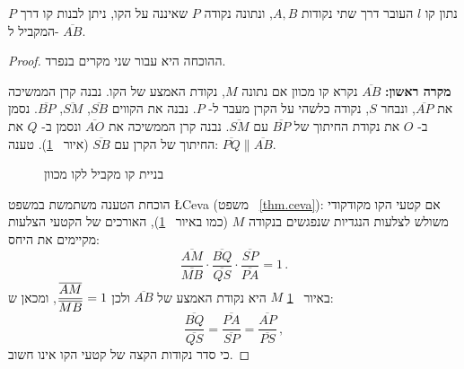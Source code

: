 \begin{theorem}\label{thm.parallel-line}
נתון קו
$l$
העובר דרך שתי נקודות
$A,B$,
ונתונה נקודה 
$P$
שאיננה על הקו, ניתן לבנות קו דרך
$P$
המקביל ל-%
$\overline{AB}$.
\end{theorem}
\begin{proof}
ההוכחה היא עבור שני מקרים בנפרד.

\textbf{מקרה ראשון:}
$\overline{AB}$
נקרא קו מכוון אם נתונה
$M$,
נקודת האמצע של הקו. נבנה קרן הממשיכה את
$\overline{AP}$,
ונבחר
$S$,
נקודה כלשהי על הקרן מעבר ל-%
$P$.
נבנה את הקווים
$\overline{SB}$, $\overline{SM}$, $\overline{BP}$.
נסמן ב-%
$O$
את נקודת החיתוך של 
$\overline{BP}$
עם
$\overline{SM}$.
נבנה קרן הממשיכה את
$\overline{AO}$
ונסמן ב-%
$Q$
את החיתוך של הקרן עם
$\overline{SB}$
(איור%
~\ref{f.se-parallel-directed}).
טענה:
$\overline{PQ}\|\overline{AB}$.

\begin{figure}[tb]
\begin{center}
\caption{בניית קו מקביל לקו מכוון}\label{f.se-parallel-directed}
\end{center}
\end{figure}
הוכחת הטענה משתמשת במשפט 
\L{Ceva}
(משפט%
~\ref{thm.ceva}): 
אם קטעי הקו מקודקודי משולש לצלעות הנגדיות שנפגשים בנקודה
$M$
(כמו באיור%
~\ref{f.se-parallel-directed}),
האורכים של הקטעי הצלעות מקיימים את היחס:
\[
\frac{\overline{AM}}{\overline{MB}}\cdot\frac{\overline{BQ}}{\overline{QS}}\cdot\frac{\overline{SP}}{\overline{PA}} = 1\,.
\]
באיור%
~\ref{f.se-parallel-directed}
$M$
היא נקודת האמצע של
$\overline{AB}$
ולכן
$\displaystyle\frac{\overline{AM}}{\overline{MB}}=1$,
ומכאן ש:
\begin{equation}
\frac{\overline{BQ}}{\overline{QS}}=\frac{\overline{PA}}{\overline{SP}}=\frac{\overline{AP}}{\overline{PS}}\,,\label{eq.ceva}
\end{equation}
כי סדר נקודות הקצה של קטעי הקו אינו חשוב.


\end{proof}

